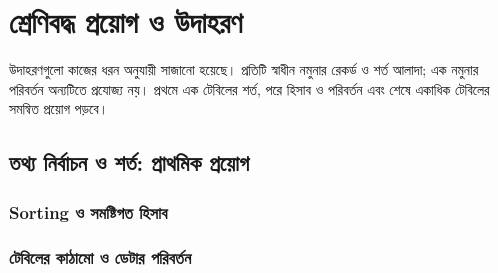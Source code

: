 \section{শ্রেণিবদ্ধ প্রয়োগ ও উদাহরণ}
\label{sec:ch06-applications}
উদাহরণগুলো কাজের ধরন অনুযায়ী সাজানো হয়েছে। প্রতিটি স্বাধীন নমুনার রেকর্ড ও শর্ত আলাদা; এক নমুনার পরিবর্তন অন্যটিতে প্রযোজ্য নয়। প্রথমে এক টেবিলের শর্ত, পরে হিসাব ও পরিবর্তন এবং শেষে একাধিক টেবিলের সমন্বিত প্রয়োগ পড়বে।
\subsection{তথ্য নির্বাচন ও শর্ত: প্রাথমিক প্রয়োগ}
\begingroup
\let\subsection\subsubsection


\endgroup
\subsection{Sorting ও সমষ্টিগত হিসাব}
\begingroup
\let\subsection\subsubsection




\endgroup
\subsection{টেবিলের কাঠামো ও ডেটার পরিবর্তন}
\begingroup
\let\subsection\subsubsection


\endgroup

